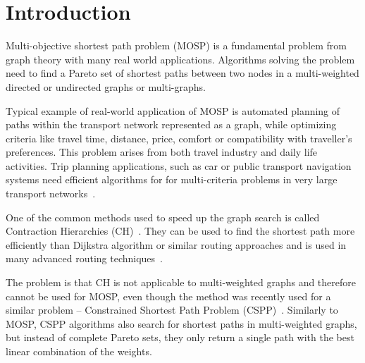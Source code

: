 % 
%  
%  
%  

\section{Introduction}
\label{secIntroduction}

Multi-objective shortest path problem (MOSP) is a fundamental problem from graph theory with many real world applications. Algorithms solving the problem need to find a Pareto set of shortest paths between two nodes in a multi-weighted directed or undirected graphs or multi-graphs. 

Typical example of real-world application of MOSP is automated planning of paths within the transport network represented as a graph, while optimizing criteria like travel time, distance, price, comfort or compatibility with traveller's preferences. This problem arises from both travel industry and daily life activities. Trip planning applications, such as car or public transport navigation systems need efficient algorithms for for multi-criteria problems in very large transport networks~\cite{veneti2016time}. 


One of the common methods used to speed up the graph search is called Contraction Hierarchies (CH)~\cite{geisberger2008contraction}. They can be used to find the shortest path more efficiently than Dijkstra algorithm or similar routing approaches and is used in many advanced routing techniques~\cite{delling2009engineering}. 

The problem is that CH is not applicable to multi-weighted graphs and therefore cannot be used for MOSP, even though the method was recently used for a similar problem -- Constrained Shortest Path Problem (CSPP)~\cite{pugliese2013survey,funke2013polynomial}. Similarly to MOSP, CSPP algorithms also search for shortest paths in multi-weighted graphs, but instead of complete Pareto sets, they only return a single path with the best linear combination of the weights.  

